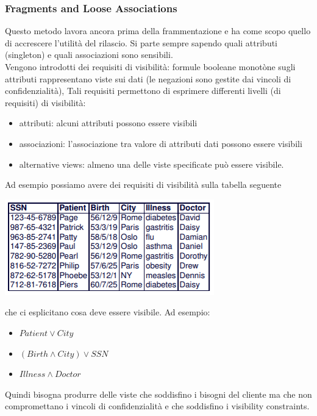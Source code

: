 \subsubsection{Fragments and Loose Associations}
Questo metodo lavora ancora prima della frammentazione e ha come scopo quello di accrescere l'utilità del rilascio. 
Si parte sempre sapendo quali attributi (singleton) e quali associazioni sono sensibili. \\
Vengono introdotti dei requisiti di visibilità: formule booleane monotòne sugli attributi rappresentano viste sui dati (le negazioni sono gestite dai vincoli di confidenzialità), Tali requisiti permettono di esprimere differenti livelli (di requisiti) di visibilità:
\begin{itemize}
    \item attributi: alcuni attributi possono essere visibili
    \item associazioni: l'associazione tra valore di attributi dati possono essere visibili
    \item alternative views: almeno una delle viste specificate può essere visibile.
\end{itemize}
Ad esempio possiamo avere dei requisiti di visibilità sulla tabella seguente
\begin{center}
    \includegraphics[scale=0.8]{img/vis1.png}
\end{center}
che ci esplicitano cosa deve essere visibile. Ad esempio:
\begin{itemize}
    \item \( Patient \lor City\)
    \item \( (Birth \land City) \lor SSN\)
    \item \( Illness \land Doctor\)
\end{itemize}
Quindi bisogna produrre delle viste che soddisfino i bisogni del cliente ma che non compromettano i vincoli di confidenzialità e che soddisfino i visibility constraints.
